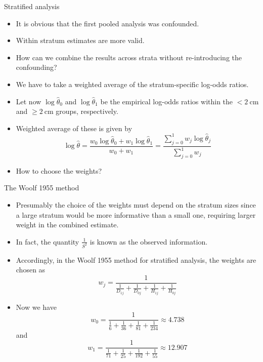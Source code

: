\documentclass[10pt,handout]{beamer}\usepackage[]{graphicx}\usepackage[]{color}
\begin{document}
\begin{frame}{Stratified analysis}
	\begin{itemize}
		\item It is obvious that the first pooled analysis was confounded.
		\item  Within stratum estimates are more valid.
		\item  How can we combine the results across strata without
		re-introducing the confounding?
		\item  We have to take a weighted average of the stratum-specific log-odds ratios.
		\item  Let now $\log \hat{\theta}_{0}$ and $\log \hat{\theta}_{1}$ be the empirical log-odds ratios within the $<2 \mathrm{~cm}$ and $\geq 2 \mathrm{~cm}$ groups, respectively.
		\item  Weighted average of these is given by
		$$
		\log \hat{\theta}=\frac{w_{0} \log \hat{\theta}_{0}+w_{1} \log \hat{\theta}_{1}}{w_{0}+w_{1}}=\frac{\sum_{j=0}^{1} w_{j} \log \hat{\theta}_{j}}{\sum_{j=0}^{1} w_{j}}
		$$
		\item  How to choose the weights?
	\end{itemize}
\end{frame}



\begin{frame}{The Woolf 1955 method}
	\begin{itemize}
		\item Presumably the choice of the weights must depend on the stratum sizes since a large stratum would be more informative than a small one, requiring larger weight in the combined estimate. 
		\item In fact, the quantity $\frac{1}{S^{2}}$ is known as the observed information.
		\item Accordingly, in the Woolf 1955 method for stratified analysis, the weights are chosen as
		$$
		w_{j}=\frac{1}{\frac{1}{D_{1 j}}+\frac{1}{D_{0 j}}+\frac{1}{H_{1 j}}+\frac{1}{H_{0 j}}}
		$$
		\item Now we have
		$$
		w_{0}=\frac{1}{\frac{1}{6}+\frac{1}{36}+\frac{1}{81}+\frac{1}{234}} \approx 4.738
		$$
		and
		$$
		w_{1}=\frac{1}{\frac{1}{71}+\frac{1}{25}+\frac{1}{192}+\frac{1}{55}} \approx 12.907
		$$
	\end{itemize}
\end{frame}
\end{document}
